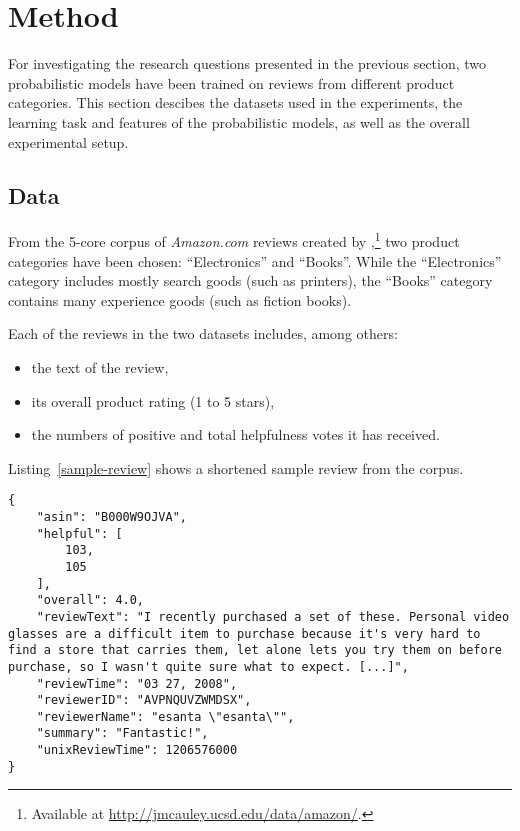 \documentclass[
    a4paper,%
    12pt,%
    oneside,%
    toc=bibliography,
    final,
]{scrartcl}
\begin{document}
\section{Method}
\label{sec:method}

For investigating the research questions presented in the previous section, two probabilistic models have been trained on reviews from different product categories. This section descibes the datasets used in the experiments, the learning task and features of the probabilistic models, as well as the overall experimental setup.

\subsection{Data}

From the 5-core corpus of \textit{Amazon.com} reviews created by \citet{HeMcAuley2016},\footnote{Available at \url{http://jmcauley.ucsd.edu/data/amazon/}.} two product categories have been chosen: “Electronics” and “Books”. While the “Electronics” category includes mostly search goods (such as printers), the “Books” category contains many experience goods (such as fiction books).

Each of the reviews in the two datasets includes, among others:

\begin{itemize}
\item the text of the review,
\item its overall product rating (1 to 5 stars),
\item the numbers of positive and total helpfulness votes it has received.
\end{itemize}

Listing~\ref{sample-review} shows a shortened sample review from the corpus.

\begin{lstlisting}[basicstyle=\ttfamily\small\singlespacing, caption=Sample review (shortened) from the “Electronics” category., label=sample-review, float]
{
    "asin": "B000W9OJVA",
    "helpful": [
        103,
        105
    ],
    "overall": 4.0,
    "reviewText": "I recently purchased a set of these. Personal video glasses are a difficult item to purchase because it's very hard to find a store that carries them, let alone lets you try them on before purchase, so I wasn't quite sure what to expect. [...]",
    "reviewTime": "03 27, 2008",
    "reviewerID": "AVPNQUVZWMDSX",
    "reviewerName": "esanta \"esanta\"",
    "summary": "Fantastic!",
    "unixReviewTime": 1206576000
}
\end{lstlisting}
\end{document}
